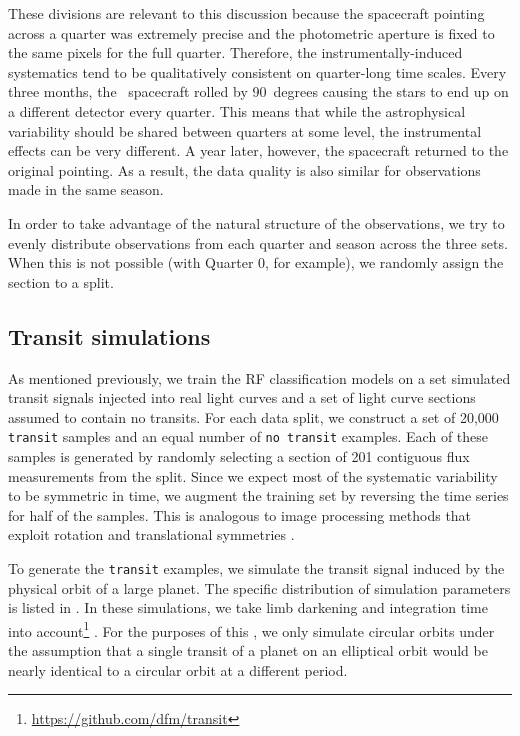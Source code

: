 These divisions are relevant to this discussion because the spacecraft
pointing across a quarter was extremely precise and the photometric aperture
is fixed to the same pixels for the full quarter.
Therefore, the instrumentally-induced systematics tend to be qualitatively
consistent on quarter-long time scales.
Every three months, the \kepler\ spacecraft rolled by 90~degrees causing the
stars to end up on a different detector every quarter.
This means that while the astrophysical variability should be shared between
quarters at some level, the instrumental effects can be very different.
A year later, however, the spacecraft returned to the original pointing.
As a result, the data quality is also similar for observations made in the
same season.

In order to take advantage of the natural structure of the observations, we
try to evenly distribute observations from each quarter and season across the
three sets.
When this is not possible (with Quarter 0, for example), we randomly assign
the section to a split.


\subsection{Transit simulations}

As mentioned previously, we train the RF classification models on a set
simulated transit signals injected into real light curves and a set of light
curve sections assumed to contain no transits.
For each data split, we construct a set of 20,000 \texttt{transit} samples and
an equal number of \texttt{no transit} examples.
Each of these samples is generated by randomly selecting a section of 201
contiguous flux measurements from the split.
Since we expect most of the systematic variability to be symmetric in time, we
augment the training set by reversing the time series for half of the samples.
This is analogous to image processing methods that exploit rotation and
translational symmetries \citep[for an example from astronomy
see][]{Dieleman:2015}.

To generate the \texttt{transit} examples, we simulate the transit signal
induced by the physical orbit of a large planet.
The specific distribution of simulation parameters is listed in .
In these simulations, we take limb darkening and integration time into
account\footnote{\url{https://github.com/dfm/transit}}
\citep{Mandel:2002, Kipping:2010}.
For the purposes of this \paper, we only simulate circular orbits under the
assumption that a single transit of a planet on an elliptical orbit would be
nearly identical to a circular orbit at a different period.

